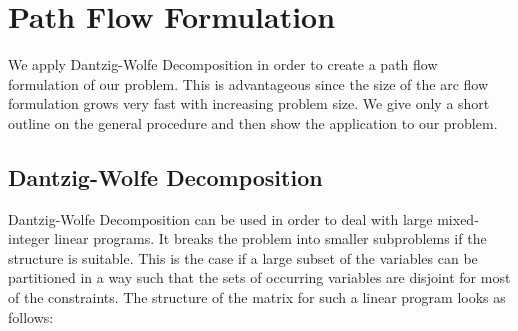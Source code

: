 \section{Path Flow Formulation}
\label{sec:pathflow_formulation}

We apply Dantzig-Wolfe Decomposition in order to create a path flow formulation of our problem. This is advantageous since the size of the arc flow formulation grows very fast with increasing problem size. We give only a short outline on the general procedure and then show the application to our problem.

\subsection{Dantzig-Wolfe Decomposition}

Dantzig-Wolfe Decomposition can be used in order to deal with large mixed-integer linear programs. It breaks the problem into smaller subproblems if the structure is suitable. This is the case if a large subset of the variables can be partitioned in a way such that the sets of occurring variables are disjoint for most of the constraints. The structure of the matrix for such a linear program looks as follows:
